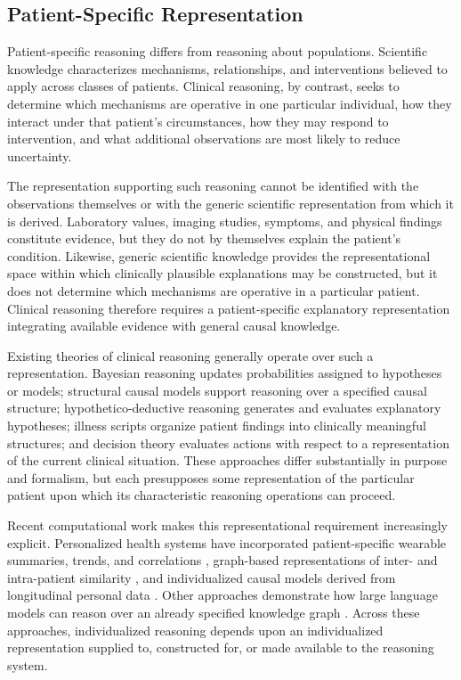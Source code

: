 \documentclass[11pt]{article}
\begin{document}
\subsection{Patient-Specific Representation}

Patient-specific reasoning differs from reasoning about populations. Scientific knowledge characterizes mechanisms, relationships, and interventions believed to apply across classes of patients. Clinical reasoning, by contrast, seeks to determine which mechanisms are operative in one particular individual, how they interact under that patient's circumstances, how they may respond to intervention, and what additional observations are most likely to reduce uncertainty.

The representation supporting such reasoning cannot be identified with the observations themselves or with the generic scientific representation from which it is derived. Laboratory values, imaging studies, symptoms, and physical findings constitute evidence, but they do not by themselves explain the patient's condition. Likewise, generic scientific knowledge provides the representational space within which clinically plausible explanations may be constructed, but it does not determine which mechanisms are operative in a particular patient. Clinical reasoning therefore requires a patient-specific explanatory representation integrating available evidence with general causal knowledge.

Existing theories of clinical reasoning generally operate over such a representation. Bayesian reasoning updates probabilities assigned to hypotheses or models; structural causal models support reasoning over a specified causal structure; hypothetico-deductive reasoning generates and evaluates explanatory hypotheses; illness scripts organize patient findings into clinically meaningful structures; and decision theory evaluates actions with respect to a representation of the current clinical situation. These approaches differ substantially in purpose and formalism, but each presupposes some representation of the particular patient upon which its characteristic reasoning operations can proceed.

Recent computational work makes this representational requirement increasingly explicit. Personalized health systems have incorporated patient-specific wearable summaries, trends, and correlations \parencite{fang_physiollm_2024}, graph-based representations of inter- and intra-patient similarity \parencite{subramanian_graph-augmented_2024}, and individualized causal models derived from longitudinal personal data \parencite{yang_chatdiet_2024,yang_personalized_2025}. Other approaches demonstrate how large language models can reason over an already specified knowledge graph \parencite{luo_reasoning_2024}. Across these approaches, individualized reasoning depends upon an individualized representation supplied to, constructed for, or made available to the reasoning system.
\end{document}
